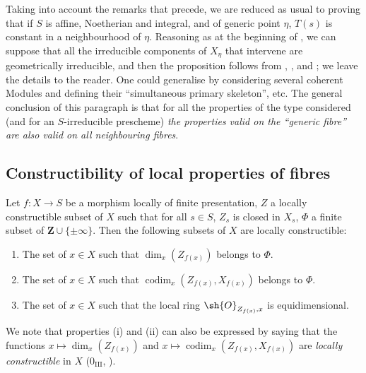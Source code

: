 \begin{remark}[9.8.9]
\medskip
Taking into account the remarks that precede, we are reduced as usual to proving that if $S$ is affine, Noetherian and integral, and of generic point $\eta$, $T(s)$ is constant in a neighbourhood of $\eta$.
Reasoning as at the beginning of , we can suppose that all the irreducible components of $X_\eta$ that intervene are geometrically irreducible, and then the proposition follows from , ,  and ; we leave the details to the reader.
One could generalise by considering several coherent Modules and defining their ``simultaneous primary skeleton'', etc.
The general conclusion of this paragraph is that for all the properties of the type considered (and for an $S$-irreducible prescheme) \emph{the properties valid on the ``generic fibre'' are also valid on all neighbouring fibres}.
\end{remark}

\subsection{Constructibility of local properties of fibres}
\label{subsection:IV.9.9}
\label{IV.9.9}

\begin{proposition}[9.9.1]
\label{IV.9.9.1}
Let $f:X\to S$ be a morphism locally of finite presentation, $Z$ a locally constructible subset of $X$ such that for all $s\in S$, $Z_s$ is closed in $X_s$, $\Phi$ a finite subset of $\mathbf{Z}\cup\{\pm\infty\}$.
Then the following subsets of $X$ are locally constructible:
\begin{enumerate}[label=(\roman*)]
  \item The set of $x\in X$ such that $\dim_x(Z_{f(x)})$ belongs to $\Phi$.
  \item The set of $x\in X$ such that $\operatorname{codim}_x(Z_{f(x)},X_{f(x)})$ belongs to $\Phi$.
  \item The set of $x\in X$ such that the local ring $\sh{O}_{Z_{f(x)},x}$ is equidimensional.
\end{enumerate}

We note that properties (i) and (ii) can also be expressed by saying that the functions $x\mapsto\dim_x(Z_{f(x)})$ and $x\mapsto\operatorname{codim}_x(Z_{f(x)},X_{f(x)})$ are \emph{locally constructible} in $X$ ($0_{\mathrm{III}}$, ).
\end{proposition}

